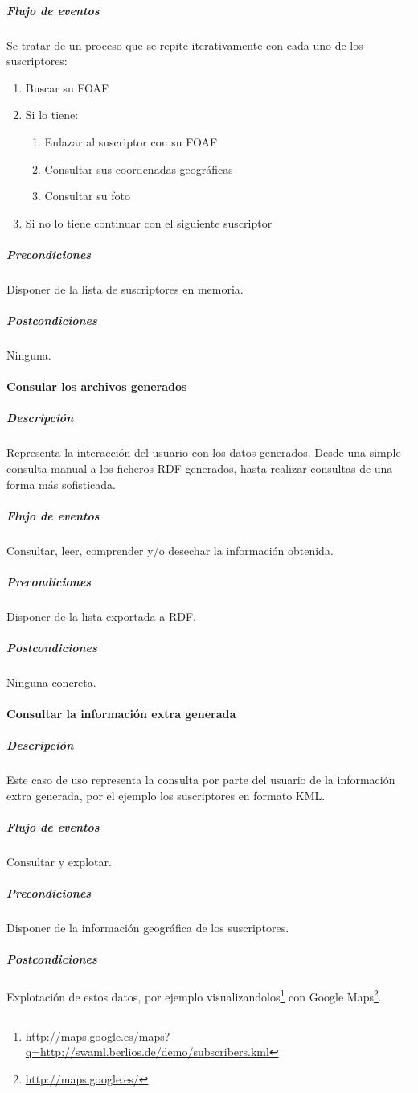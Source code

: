 \subparagraph{Flujo de eventos}Se tratar de un proceso que se repite
iterativamente con cada uno de los suscriptores:
\begin{enumerate}
 \item Buscar su FOAF
 \item Si lo tiene:
 \begin{enumerate}
  \item	Enlazar al suscriptor con su FOAF
  \item Consultar sus coordenadas geográficas
  \item Consultar su foto
 \end{enumerate}
 \item Si no lo tiene continuar con el siguiente suscriptor
\end{enumerate}


\subparagraph{Precondiciones}Disponer de la lista de suscriptores en
memoria.

\subparagraph{Postcondiciones}Ninguna.


\paragraph{Consular los archivos generados}

\subparagraph{Descripción}Representa la interacción del usuario con los
datos generados. Desde una simple consulta manual a los ficheros RDF
generados, hasta realizar consultas de una forma más sofisticada.

\subparagraph{Flujo de eventos}Consultar, leer, comprender y/o desechar 
la información obtenida.

\subparagraph{Precondiciones}Disponer de la lista exportada a RDF.

\subparagraph{Postcondiciones}Ninguna concreta.


\paragraph{Consultar la información extra generada}

\subparagraph{Descripción}Este caso de uso representa la consulta por
parte del usuario de la información extra generada, por el ejemplo los
suscriptores en formato KML.

\subparagraph{Flujo de eventos}Consultar y explotar.

\subparagraph{Precondiciones}Disponer de la información geográfica de
los suscriptores.

\subparagraph{Postcondiciones}Explotación de estos datos, por ejemplo
visualizandolos\footnote{\url{http://maps.google.es/maps?q=http://swaml.berlios.de/demo/subscribers.kml}} 
con Google Maps\footnote{\url{http://maps.google.es/}}.


